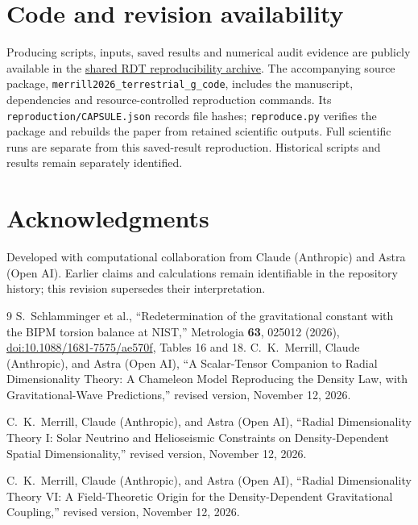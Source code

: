 \documentclass[11pt,a4paper]{article}
\begin{document}
\section*{Code and revision availability}
Producing scripts, inputs, saved results and numerical audit evidence are
publicly available in the \href{https://github.com/chrismerrill1974/solarcore_code/tree/main/reproduction}{shared RDT reproducibility archive}.
The accompanying source package, \nolinkurl{merrill2026_terrestrial_g_code}, includes the
manuscript, dependencies and resource-controlled reproduction commands.
Its \texttt{reproduction/CAPSULE.json} records file hashes;
\texttt{reproduce.py} verifies the package and rebuilds the paper from retained
scientific outputs. Full scientific runs are separate from this saved-result
reproduction. Historical scripts and results remain separately identified.

\section*{Acknowledgments}
Developed with computational collaboration from Claude (Anthropic) and
Astra (Open AI). Earlier claims and calculations remain identifiable in the
repository history; this revision supersedes their interpretation.
\begin{thebibliography}{9}
 S.~Schlamminger et al., ``Redetermination of the gravitational
constant with the BIPM torsion balance at NIST,'' Metrologia
\textbf{63}, 025012 (2026),
\href{https://doi.org/10.1088/1681-7575/ae570f}{doi:10.1088/1681-7575/ae570f},
Tables 16 and 18.
 C.~K.~Merrill, Claude (Anthropic), and Astra (Open AI),
``A Scalar-Tensor Companion to Radial Dimensionality Theory: A Chameleon Model Reproducing the Density Law, with Gravitational-Wave Predictions,''
revised version, November 12, 2026.

 C.~K.~Merrill, Claude (Anthropic), and Astra (Open AI),
``Radial Dimensionality Theory I: Solar Neutrino and Helioseismic Constraints on Density-Dependent Spatial Dimensionality,''
revised version, November 12, 2026.

 C.~K.~Merrill, Claude (Anthropic), and Astra (Open AI),
``Radial Dimensionality Theory VI: A Field-Theoretic Origin for the Density-Dependent Gravitational Coupling,''
revised version, November 12, 2026.

\end{thebibliography}
\end{document}
